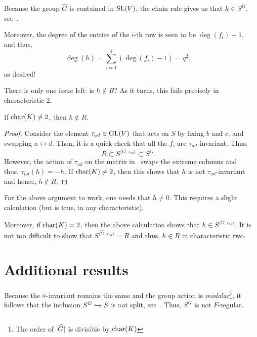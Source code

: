 \documentclass[12pt]{article}
\begin{document}
	Because the group $\widehat{G}$ is contained in $\operatorname{SL}(V)$, the chain rule gives us that $h \in S^{G}$, see~\Cite[Proposition 1.5.6]{Smith:PolynomialInvariantsBook}. 

	Moreover, the degree of the entries of the $i$-th row is seen to be $\deg(f_{i}) - 1$, and thus,
	\begin{equation*} 
		\deg(h) = \sum_{i = 1}^{4} (\deg(f_{i}) - 1) = \boxed{q^{2}},
	\end{equation*}
	as desired!

	There is only one issue left: is $h \notin R$? As it turns, this fails precisely in characteristic $2$.

	\begin{thm}
		If $\operatorname{char}(K) \neq 2$, then $h \notin R$.
	\end{thm}
	\begin{proof} 
		Consider the element $\tau_{ad} \in \operatorname{GL}(V)$ that acts on $S$ by fixing $b$ and $c$, and swapping $a \leftrightarrow d$. 
		Then, it is a quick check that all the $f_{i}$ are $\tau_{ad}$-invariant. 
		Thus,
		\begin{equation*} 
			R \subset S^{\langle \widehat{G}, \tau_{ad} \rangle} \subset S^{G}.
		\end{equation*}
		However, the action of $\tau_{ad}$ on the matrix in~ swaps the extreme columns and thus, $\tau_{ad}(h) = -h$. 
		If $\operatorname{char}(K) \neq 2$, then this shows that $h$ is not $\tau_{ad}$-invariant and hence, $h \notin R$.
	\end{proof}

	\begin{rem}
		For the above argument to work, one needs that $h \neq 0$. 
		This requires a slight calculation (but is true, in any characteristic). 

		Moreover, if $\operatorname{char}(K) = 2$, then the above calculation shows that $h \in S^{\langle \widehat{G}, \tau_{ad} \rangle}$. 
		It is not too difficult to show that $S^{\langle \widehat{G}, \tau_{ad} \rangle} = R$ and thus, $h \in R$ in characteristic two.
	\end{rem}

\section{Additional results}
	
	Because the $a$-invariant remains the same and the group action is \emph{modular}\footnote{The order of ${\lvert \widehat{G} \lvert}$ is divisible by $\operatorname{char}(K)$}, it follows that the inclusion $S^{G} \hookrightarrow S$ is not split, see~\Cite[Corollary 4.2]{GoelJeffriesSingh}. 
	Thus, $S^{G}$ is not $F$-regular.
\end{document}
